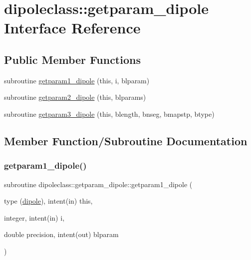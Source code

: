 \hypertarget{interfacedipoleclass_1_1getparam__dipole}{}\section{dipoleclass\+::getparam\+\_\+dipole Interface Reference}
\label{interfacedipoleclass_1_1getparam__dipole}
\subsection*{Public Member Functions}
\begin{DoxyCompactItemize}
\item 
subroutine \mbox{\hyperlink{interfacedipoleclass_1_1getparam__dipole_a8173ea38b02eb5499f692c84561b3070}{getparam1\+\_\+dipole}} (this, i, blparam)
\item 
subroutine \mbox{\hyperlink{interfacedipoleclass_1_1getparam__dipole_ae4a9ad472e55e0aa869dd301c8c16b5e}{getparam2\+\_\+dipole}} (this, blparams)
\item 
subroutine \mbox{\hyperlink{interfacedipoleclass_1_1getparam__dipole_a4411e302e38a13c7d652369f54ca1ac9}{getparam3\+\_\+dipole}} (this, blength, bnseg, bmapstp, btype)
\end{DoxyCompactItemize}


\subsection{Member Function/\+Subroutine Documentation}
\mbox{\label{interfacedipoleclass_1_1getparam__dipole_a8173ea38b02eb5499f692c84561b3070}} 
\subsubsection{\texorpdfstring{getparam1\_dipole()}{getparam1\_dipole()}}
{\footnotesize\ttfamily subroutine dipoleclass\+::getparam\+\_\+dipole\+::getparam1\+\_\+dipole (\begin{DoxyParamCaption}\item[{type (\mbox{\hyperlink{namespacedipoleclass_structdipoleclass_1_1dipole}{dipole}}), intent(in)}]{this,  }\item[{integer, intent(in)}]{i,  }\item[{double precision, intent(out)}]{blparam }\end{DoxyParamCaption})}

